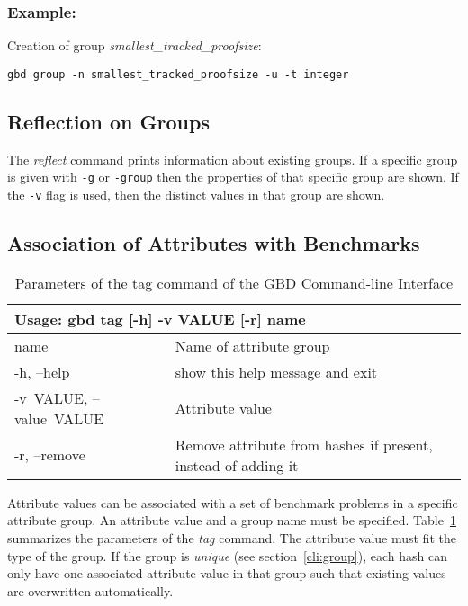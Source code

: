\documentclass{easychair}
\begin{document}
\subsubsection{Example:}Creation of group \emph{smallest\_tracked\_proofsize}:
\begin{verbatim}
gbd group -n smallest_tracked_proofsize -u -t integer
\end{verbatim}


\subsection{Reflection on Groups}
\label{cli:reflect}

The \emph{reflect} command prints information about existing groups. If a specific group is given with \texttt{-g} or \texttt{\textendash-group} then the properties of that specific group are shown. If the \texttt{-v} flag is used, then the distinct values in that group are shown. 


\subsection{Association of Attributes with Benchmarks}
\label{cli:tag}

\begin{table}[ht]
\begin{tabular}{p{.21\linewidth}|p{.71\linewidth}}
\multicolumn{2}{l}{\bf Usage: \textsf{gbd tag [-h] -v VALUE [-r] name}}\\

\hline
  \sf name                  &Name of attribute group\\

  \sf -h, --help            &show this help message and exit\\
  \sf \mbox{-v VALUE}, \mbox{--value VALUE}
                        &Attribute value\\
  \sf -r, --remove          &Remove attribute from hashes if present, instead of
                        adding it
\end{tabular}
\caption{Parameters of the tag command of the GBD Command-line Interface}
\label{fig:cli:tag}
\end{table}

Attribute values can be associated with a set of benchmark problems in a specific attribute group. 
An attribute value and a group name must be specified. 
Table~\ref{fig:cli:tag} summarizes the parameters of the \emph{tag} command. 
The attribute value must fit the type of the group.
If the group is \emph{unique} (see section~\ref{cli:group}), each hash can only have one associated attribute value in that group such that existing values are overwritten automatically.
\end{document}

